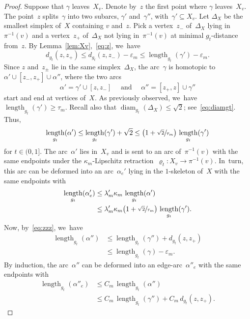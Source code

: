 \documentclass[11pt]{article}
\let\oldsfrac\sfrac
\renewcommand{\sfrac}[2]{{\oldsfrac{#1}{#2}}}
\theoremstyle{definition}
\DeclareMathOperator\diam{diam}
\DeclareMathOperator{\length}{length}
\numberwithin{equation}{section}
\begin{document}
\begin{proof}
Suppose that $\gamma$ leaves~$X_v$.
Denote by~$z$ the first point where $\gamma$ leaves~$X_v$.
The point~$z$ splits~$\gamma$ into two subarcs, $\gamma'$ and~$\gamma''$, with~$\gamma' \subseteq X_v$.
Let $\Delta_X$ be the smallest simplex of~$X$ containing $v$ and~$z$.
Pick a vertex~$z_-$ of~$\Delta_X$ lying in~$\pi^{-1}(v)$ and a vertex~$z_+$ of~$\Delta_X$ not lying in~$\pi^{-1}(v)$ at minimal $g_t$-distance from~$z$.
By Lemma~\ref{lem:Xv},~\eqref{eq:z}, we~have
\begin{equation} \label{eq:zzz}
d_{g_t}(z,z_+) \leq d_{g_t}(z,z_-) - \varepsilon_m \leq \length_{g_t}(\gamma') - \varepsilon_m.
\end{equation}
Since $z$ and~$z_{\pm}$ lie in the same simplex~$\Delta_X$, the arc~$\gamma$ is homotopic to~$\alpha' \cup [z_-,z_+] \cup \alpha''$, where the two arcs
\[
\alpha' = \gamma' \cup [z,z_-] \quad \mbox { and } \quad \alpha'' = [z_+,z] \cup \gamma''
\]
start and end at vertices of~$X$.
As previously observed, we~have $\length_{g_t}(\gamma') \geq \tau_m$.
Recall also that $\diam_{g_t}(\Delta_X) \leq \sqrt{2}$; see~\eqref{eq:diamgt}.
Thus,
\[
\length_{g_t}(\alpha') \leq \length_{g_t}(\gamma') + \sqrt{2} \leq \bigl(1+\sfrac{\sqrt{2}}{\tau_m} \bigr) \, \length_{g_t}(\gamma')
\]
for $t \in (0,1]$.
The arc~$\alpha'$ lies in~$X_v$ and is sent to an arc of~$\pi^{-1}(v)$ with the same endpoints under the $\kappa_m$-Lipschitz retraction~$\varrho_t:X_v \to \pi^{-1}(v)$. In~turn, this arc can be deformed into an arc~$\alpha_e'$ lying in the $1$-skeleton of~$X$ with the same endpoints with
\begin{equation}\label{eq:a'}
\begin{aligned}
\length_{g_t}(\alpha_e') & \leq \lambda'_m \kappa_m \, \length_{g_t}(\alpha') \\ & \leq \lambda'_m \kappa_m \bigl(1 + \sfrac{\sqrt{2}}{\tau_m} \bigr) \, \length_{g_t}(\gamma'). \end{aligned}
\end{equation}
Now, by~\eqref{eq:zzz}, we~have
\begin{align*}
\length_{g_t}(\alpha'') & \leq \length_{g_t}(\gamma'') + d_{g_t}(z,z_+) \\ & \leq \length_{g_t}(\gamma) - \varepsilon_m.
\end{align*}
By induction, the arc~$\alpha''$ can be deformed into an edge-arc~$\alpha''_e$ with the same endpoints with
\begin{equation}\label{eq:a''}
\begin{aligned}
\length_{g_t}(\alpha''_e) & \leq C_m \, \length_{g_t}(\alpha'') \\ & \leq C_m \, \length_{g_t}(\gamma'') + C_m \, d_{g_t}(z,z_+).

\end{aligned}
\end{equation}
\end{proof}
\end{document}
